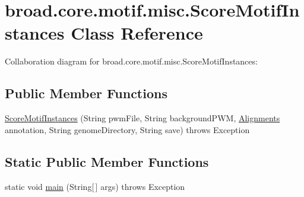 \hypertarget{classbroad_1_1core_1_1motif_1_1misc_1_1_score_motif_instances}{\section{broad.\+core.\+motif.\+misc.\+Score\+Motif\+Instances Class Reference}
\label{classbroad_1_1core_1_1motif_1_1misc_1_1_score_motif_instances}
}


Collaboration diagram for broad.\+core.\+motif.\+misc.\+Score\+Motif\+Instances\+:
\subsection*{Public Member Functions}
\begin{DoxyCompactItemize}
\item 
\hyperlink{classbroad_1_1core_1_1motif_1_1misc_1_1_score_motif_instances_ab64429e0578bbb80408fac9c5359a830}{Score\+Motif\+Instances} (String pwm\+File, String background\+P\+W\+M, \hyperlink{classbroad_1_1pda_1_1datastructures_1_1_alignments}{Alignments} annotation, String genome\+Directory, String save)  throws Exception
\end{DoxyCompactItemize}
\subsection*{Static Public Member Functions}
\begin{DoxyCompactItemize}
\item 
static void \hyperlink{classbroad_1_1core_1_1motif_1_1misc_1_1_score_motif_instances_abbc985d2c658fd586e8bb2d5732b994c}{main} (String\mbox{[}$\,$\mbox{]} args)  throws Exception
\end{DoxyCompactItemize}


